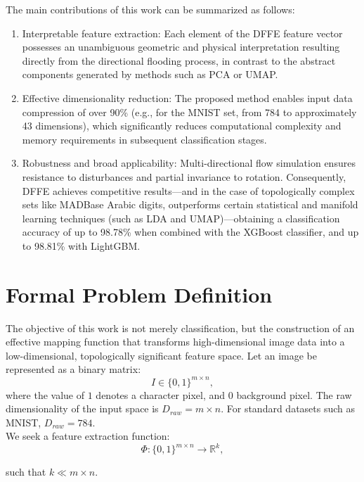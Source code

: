 \documentclass[a4paper,fleqn]{cas-dc}
\begin{document}
The main contributions of this work can be summarized as follows:

\begin{enumerate}
    \item Interpretable feature extraction: 
    Each element of the DFFE feature vector possesses an unambiguous geometric and physical interpretation resulting directly from the directional flooding process, in contrast to the abstract components generated by methods such as PCA or UMAP.
    
    \item Effective dimensionality reduction: 
    The proposed method enables input data compression of over 90\% (e.g., for the MNIST set, from 784 to approximately 43 dimensions), which significantly reduces computational complexity and memory requirements in subsequent classification stages.

    \item Robustness and broad applicability: 
    Multi-directional flow simulation ensures resistance to disturbances and partial invariance to rotation. Consequently, DFFE achieves competitive results—and in the case of topologically complex sets like MADBase Arabic digits, outperforms certain statistical and manifold learning techniques (such as LDA and UMAP)—obtaining a classification accuracy of up to 98.78\% when combined with the XGBoost classifier, and up to 98.81\% with LightGBM.
\end{enumerate}

\section{Formal Problem Definition}\label{sec-problem-formulation}

The objective of this work is not merely classification, but the construction of an effective mapping function that transforms high-dimensional image data into a low-dimensional, topologically significant feature space. Let an image be represented as a binary matrix:
\[
I \in \{0,1\}^{m \times n},
\]
where the value of $1$ denotes a character pixel, and $0$ background pixel. The raw dimensionality of the input space is $D_{raw} = m \times n$. For standard datasets such as MNIST, $D_{raw} = 784$. \\

We seek a feature extraction function:
\[
\Phi: \{0,1\}^{m\times n} \rightarrow \mathbb{R}^k,
\]

such that $k \ll m \times n$. \\
\end{document}
